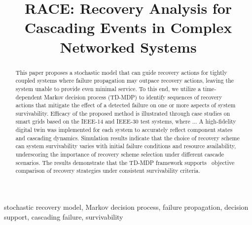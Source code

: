 \documentclass[conference]{IEEEtran}
\begin{document}
%

\title{RACE: Recovery Analysis for Cascading Events in Complex Networked Systems}




%



\maketitle              %
%
\begin{abstract}
This paper proposes a stochastic model that can guide recovery actions for tightly coupled systems where failure propagation may outpace recovery actions, leaving the system unable to provide even minimal service. 
To this end, we utilize a time-dependent Markov decision process (TD-MDP) to identify sequences of recovery actions that mitigate the effect of a detected failure on one or more aspects of system survivability. 
Efficacy of the proposed method is illustrated through case studies on smart grids based on the IEEE-14 and IEEE-30 test systems, where ...  A high-fidelity digital twin was implemented for each system  to accurately reflect component states and cascading dynamics. Simulation results indicate that the choice of recovery scheme can system survivability varies with initial failure conditions and resource availability, underscoring the importance of recovery scheme selection under different cascade scenarios. The results demonstrate that the TD-MDP framework supports  objective comparison of recovery strategies under consistent survivability criteria.
\end{abstract}

\begin{IEEEkeywords}
stochastic recovery model, Markov decision process, failure propagation, decision support, cascading failure, survivability
\end{IEEEkeywords}

\end{document}
